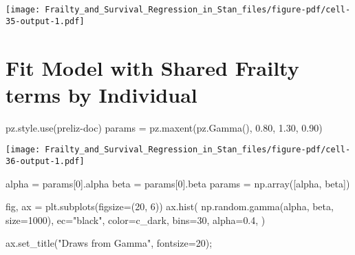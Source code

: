 \documentclass[
  letterpaper,
  DIV=11,
  numbers=noendperiod]{scrartcl}
\newenvironment{Shaded}{\begin{snugshade}}{\end{snugshade}}
\newcommand{\DecValTok}[1]{\textcolor[rgb]{0.68,0.00,0.00}{#1}}
\newcommand{\FloatTok}[1]{\textcolor[rgb]{0.68,0.00,0.00}{#1}}
\newcommand{\NormalTok}[1]{\textcolor[rgb]{0.00,0.23,0.31}{#1}}
\newcommand{\OperatorTok}[1]{\textcolor[rgb]{0.37,0.37,0.37}{#1}}
\newcommand{\StringTok}[1]{\textcolor[rgb]{0.13,0.47,0.30}{#1}}
\begin{document}
\texttt{[image: Frailty\_and\_Survival\_Regression\_in\_Stan\_files/figure-pdf/cell-35-output-1.pdf]}

\section{Fit Model with Shared Frailty terms by
Individual}\label{fit-model-with-shared-frailty-terms-by-individual}

\begin{Shaded}
\begin{Highlighting}[]
\NormalTok{pz.style.use(}\StringTok{\textquotesingle{}preliz{-}doc\textquotesingle{}}\NormalTok{)}
\NormalTok{params }\OperatorTok{=}\NormalTok{ pz.maxent(pz.Gamma(), }\FloatTok{0.80}\NormalTok{, }\FloatTok{1.30}\NormalTok{, }\FloatTok{0.90}\NormalTok{)}
\end{Highlighting}
\end{Shaded}

\texttt{[image: Frailty\_and\_Survival\_Regression\_in\_Stan\_files/figure-pdf/cell-36-output-1.pdf]}

\begin{Shaded}
\begin{Highlighting}[]
\NormalTok{alpha }\OperatorTok{=}\NormalTok{ params[}\DecValTok{0}\NormalTok{].alpha}
\NormalTok{beta }\OperatorTok{=}\NormalTok{ params[}\DecValTok{0}\NormalTok{].beta}
\NormalTok{params }\OperatorTok{=}\NormalTok{ np.array([alpha, beta])}
\end{Highlighting}
\end{Shaded}

\begin{Shaded}
\begin{Highlighting}[]
\NormalTok{fig, ax }\OperatorTok{=}\NormalTok{ plt.subplots(figsize}\OperatorTok{=}\NormalTok{(}\DecValTok{20}\NormalTok{, }\DecValTok{6}\NormalTok{))}
\NormalTok{ax.hist(}
\NormalTok{    np.random.gamma(alpha, beta, size}\OperatorTok{=}\DecValTok{1000}\NormalTok{),}
\NormalTok{    ec}\OperatorTok{=}\StringTok{"black"}\NormalTok{,}
\NormalTok{    color}\OperatorTok{=}\NormalTok{c\_dark,}
\NormalTok{    bins}\OperatorTok{=}\DecValTok{30}\NormalTok{,}
\NormalTok{    alpha}\OperatorTok{=}\FloatTok{0.4}\NormalTok{,}
\NormalTok{)}

\NormalTok{ax.set\_title(}\StringTok{"Draws from Gamma"}\NormalTok{, fontsize}\OperatorTok{=}\DecValTok{20}\NormalTok{)}\OperatorTok{;}
\end{Highlighting}
\end{Shaded}
\end{document}
